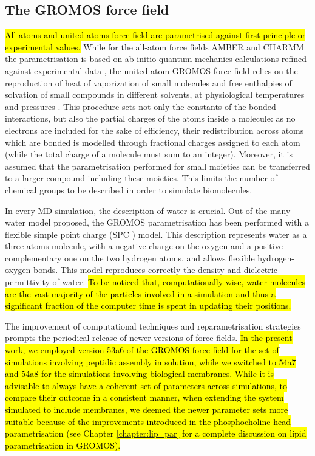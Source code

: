 \subsection{The GROMOS force field}
\hl{All-atoms and united atoms force field are parametrised against first-principle or experimental values.}
%
While for the all-atom force fields AMBER and CHARMM the parametrisation is based on ab initio quantum mechanics calculations refined against experimental data \cite{Maier2015,Dickson2014,Wang2004_amber,MacKerell1998,Klauda2010}, the united atom GROMOS force field relies on the reproduction of heat of vaporization of small molecules and free enthalpies of solvation of small compounds in different solvents, at physiological temperatures and pressures \cite{Oostenbrink2005,Schmid2011,Reif2013}.
%
This procedure sets not only the constants of the bonded interactions, but also the partial charges of the atoms inside a molecule: as no electrons are included for the sake of efficiency, their redistribution across atoms which are bonded is modelled through fractional charges assigned to each atom (while the total charge of a molecule must sum to an integer).
%
Moreover, it is assumed that the parametrisation performed for small moieties can be transferred to a larger compound including these moieties. This limits the number of chemical groups to be described in order to simulate biomolecules.

In every MD simulation, the description of water is crucial. Out of the many water model proposed, the GROMOS parametrisation has been performed with a flexible simple point charge (SPC \cite{Berendsen1981}) model. This description represents water as a three atoms molecule, with a negative charge on the oxygen and a positive complementary one on the two hydrogen atoms, and allows flexible hydrogen-oxygen bonds. This model reproduces correctly the density and dielectric permittivity of water. \hl{To be noticed that, computationally wise, water molecules are the vast majority of the particles involved in a simulation and thus a significant fraction of the computer time is spent in updating their positions.}

The improvement of computational techniques and reparametrisation strategies prompts the periodical release of newer versions of force fields. \hl{In the present work, we employed version 53a6 of the GROMOS force field \cite{Oostenbrink2004} for the set of simulations involving peptidic assembly in solution, while we switched to 54a7 \cite{Schmid2011} and 54a8 \cite{Reif2013} for the simulations involving biological membranes. While it is advisable to always have a coherent set of parameters across simulations, to compare their outcome in a consistent manner, when extending the system simulated to include membranes, we deemed the newer parameter sets more suitable because of the improvements introduced in the phosphocholine head parametrisation (see Chapter \ref{chapter:lip_par} for a complete discussion on lipid parametrisation in GROMOS).}


